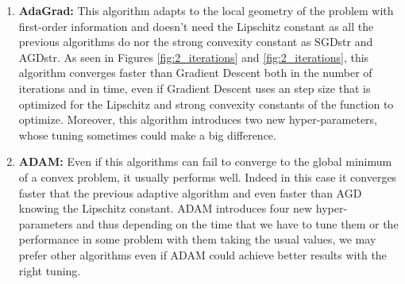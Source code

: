 \documentclass[letterpaper]{article}
\providecommand{\1}{\mathbf{1}}
\providecommand{\0}{\mathbf{0}}
\begin{document}
\begin{enumerate}[label=(\alph*)]
    \item \textbf{AdaGrad: }This algorithm adapts to the local geometry of the problem with first-order information and doesn't need the Lipschitz constant as all the previous algorithms do nor the strong convexity constant as SGDstr and AGDstr. As seen in Figures \ref{fig:2_iterations} and \ref{fig:2_iterations}, this algorithm converges faster than Gradient Descent both in the number of iterations and in time, even if Gradient Descent uses an step size that is optimized for the Lipschitz and strong convexity constants of the function to optimize. Moreover, this algorithm introduces two new hyper-parameters, whose tuning sometimes could make a big difference.
    
    \item \textbf{ADAM: }Even if this algorithms can fail to converge to the global minimum of a convex problem, it usually performs well. Indeed in this case it converges faster that the previous adaptive algorithm and even faster than AGD knowing the Lipschitz constant. ADAM introduces four new hyper-parameters and thus depending on the time that we have to tune them or the performance in some problem with them taking the usual values, we may prefer other algorithms even if ADAM could achieve better results with the right tuning.
\end{enumerate}
\end{document}
